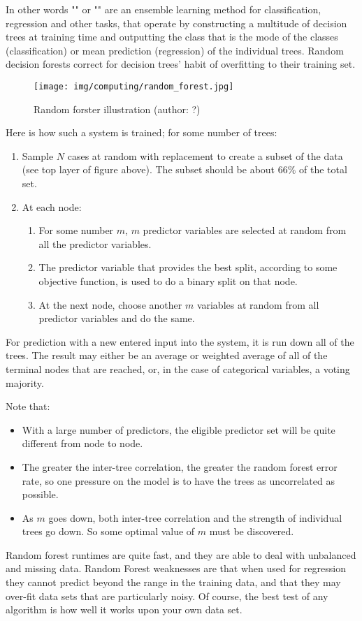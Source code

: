	In other words "" or "" are an ensemble learning method for classification, regression and other tasks, that operate by constructing a multitude of decision trees at training time and outputting the class that is the mode of the classes (classification) or mean prediction (regression) of the individual trees. Random decision forests correct for decision trees' habit of overfitting to their training set.
	\begin{figure}[H]
		\centering
		\texttt{[image: img/computing/random\_forest.jpg]}
		\caption[Random forster illustration]{Random forster illustration (author: ?)}
	\end{figure}
	Here is how such a system is trained; for some number of trees:
	\begin{enumerate}
		\item Sample $N$ cases at random with replacement to create a subset of the data (see top layer of figure above). The subset should be about $66\%$ of the total set.
	
		\item At each node:
		\begin{enumerate}
			\item For some number $m$, $m$ predictor variables are selected at random from all the predictor variables.
	
			\item The predictor variable that provides the best split, according to some objective function, is used to do a binary split on that node.
	
			\item At the next node, choose another $m$ variables at random from all predictor variables and do the same.
		\end{enumerate}
	\end{enumerate}
	For prediction with a new entered input into the system, it is run down all of the trees. The result may either be an average or weighted average of all of the terminal nodes that are reached, or, in the case of categorical variables, a voting majority.
	
	Note that:
	\begin{itemize}
		\item With a large number of predictors, the eligible predictor set will be quite different from node to node.
		\item The greater the inter-tree correlation, the greater the random forest error rate, so one pressure on the model is to have the trees as uncorrelated as possible.
		\item As $m$ goes down, both inter-tree correlation and the strength of individual trees go down. So some optimal value of $m$ must be discovered.
	\end{itemize}
	Random forest runtimes are quite fast, and they are able to deal with unbalanced and missing data. Random Forest weaknesses are that when used for regression they cannot predict beyond the range in the training data, and that they may over-fit data sets that are particularly noisy. Of course, the best test of any algorithm is how well it works upon your own data set.

